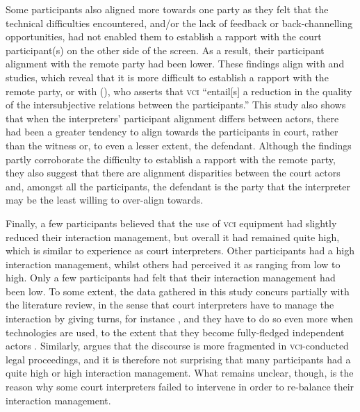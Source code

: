 \documentclass[output=paper]{langsci/langscibook}
\begin{document}
Some participants also aligned more towards one party as they felt that the technical difficulties encountered, and/or the lack of feedback or back-channell\-ing opportunities, had not enabled them to establish a rapport with the court participant(s) on the other side of the screen. As a result, their participant alignment with the remote party had been lower. These findings align with  and  studies, which reveal that it is more difficult to establish a rapport with the remote party, or with \citeauthor{Braun2016b} (\citeyear[4]{Braun2016b}), who asserts that \textsc{vci} “entail[s] a reduction in the quality of the intersubjective relations between the participants.” This study also shows that when the interpreters’ participant alignment differs between actors, there had been a greater tendency to align towards the participants in court, rather than the witness or, to even a lesser extent, the defendant. Although the findings partly corroborate the difficulty to establish a rapport with the remote party, they also suggest that there are alignment disparities between the court actors and, amongst all the participants, the defendant is the party that the interpreter may be the least willing to over-align towards.

Finally, a few participants believed that the use of \textsc{vci} equipment had slightly reduced their interaction management, but overall it had remained quite high, which is similar to  experience as court interpreters. Other participants had a high interaction management, whilst others had perceived it as ranging from low to high. Only a few participants had felt that their interaction management had been low. To some extent, the data gathered in this study concurs partially with the literature review, in the sense that court interpreters have to manage the interaction by giving turns, for instance \citep{Angelelli2003,Llewellyn-Jones2014,Martin2008}, and they have to do so even more when technologies are used, to the extent that they become fully-fledged independent actors \citep{Lee2007,Rosenberg2007}. Similarly, \citet{Braun2016a} argues that the discourse is more fragmented in \textsc{vci}-conducted legal proceedings, and it is therefore not surprising that many participants had a quite high or high interaction management. What remains unclear, though, is the reason why some court interpreters failed to intervene in order to re-balance their interaction management. 
\end{document}
